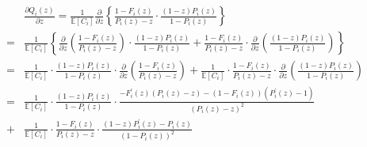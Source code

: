 \documentclass{article}
\newcommand{\esp}{\mathbb{E}}
\begin{document}
\begin{eqnarray*}
&&\frac{\partial Q_{i}\left(z\right)}{\partial z}=\frac{1}{\esp\left[C_{i}\right]}\frac{\partial}{\partial z}\left\{\frac{1-F_{i}\left(z\right)}{P_{i}\left(z\right)-z}\cdot\frac{\left(1-z\right)P_{i}\left(z\right)}{1-P_{i}\left(z\right)}\right\}\\
&=&\frac{1}{\esp\left[C_{i}\right]}\left\{\frac{\partial}{\partial z}\left(\frac{1-F_{i}\left(z\right)}{P_{i}\left(z\right)-z}\right)\cdot\frac{\left(1-z\right)P_{i}\left(z\right)}{1-P_{i}\left(z\right)}+\frac{1-F_{i}\left(z\right)}{P_{i}\left(z\right)-z}\cdot\frac{\partial}{\partial z}\left(\frac{\left(1-z\right)P_{i}\left(z\right)}{1-P_{i}\left(z\right)}\right)\right\}\\
&=&\frac{1}{\esp\left[C_{i}\right]}\cdot\frac{\left(1-z\right)P_{i}\left(z\right)}{1-P_{i}\left(z\right)}\cdot\frac{\partial}{\partial z}\left(\frac{1-F_{i}\left(z\right)}{P_{i}\left(z\right)-z}\right)+\frac{1}{\esp\left[C_{i}\right]}\cdot\frac{1-F_{i}\left(z\right)}{P_{i}\left(z\right)-z}\cdot\frac{\partial}{\partial z}\left(\frac{\left(1-z\right)P_{i}\left(z\right)}{1-P_{i}\left(z\right)}\right)\\
&=&\frac{1}{\esp\left[C_{i}\right]}\cdot\frac{\left(1-z\right)P_{i}\left(z\right)}{1-P_{i}\left(z\right)}\cdot\frac{-F_{i}^{'}\left(z\right)\left(P_{i}\left(z\right)-z\right)-\left(1-F_{i}\left(z\right)\right)\left(P_{i}^{'}\left(z\right)-1\right)}{\left(P_{i}\left(z\right)-z\right)^{2}}\\
&+&\frac{1}{\esp\left[C_{i}\right]}\cdot\frac{1-F_{i}\left(z\right)}{P_{i}\left(z\right)-z}\cdot\frac{\left(1-z\right)P_{i}^{'}\left(z\right)-P_{i}\left(z\right)}{\left(1-P_{i}\left(z\right)\right)^{2}}
\end{eqnarray*}
\end{document}
